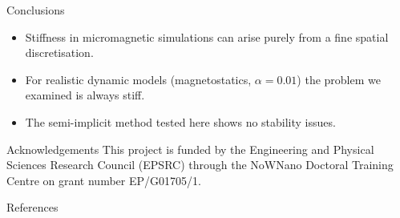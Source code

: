 \documentclass[final]{beamer} %
\newlength{\wideitemsep}
\let\olditem\item
\renewcommand{\item}{\setlength{\itemsep}{\wideitemsep}\olditem}
\let\cite=\supercite
\begin{document}
\begin{frame}
\begin{columns}
\begin{column}{0.47\textwidth}
{        %



        \vfill

        \begin{block}{\boxnumber Conclusions}
          \begin{itemize}
          \item Stiffness in micromagnetic simulations can arise purely from a fine spatial discretisation.
          \item For realistic dynamic models (magnetostatics, $\alpha = 0.01$) the problem we examined is always stiff.
          \item The semi-implicit method tested here shows no stability issues.
          \end{itemize}
        \end{block}

        \vfill

        \begin{block}{\boxnumber Acknowledgements}
          This project is funded by the Engineering and Physical Sciences
          Research Council (EPSRC) through the NoWNano Doctoral Training Centre on
          grant number EP/G01705/1.
        \end{block}

        \vfill

        \begin{block}{\boxnumber References}
          \printbibliography
        \end{block}

        \vfill

      } %
    \end{column}

  \end{columns}
\end{frame}
\end{document}
